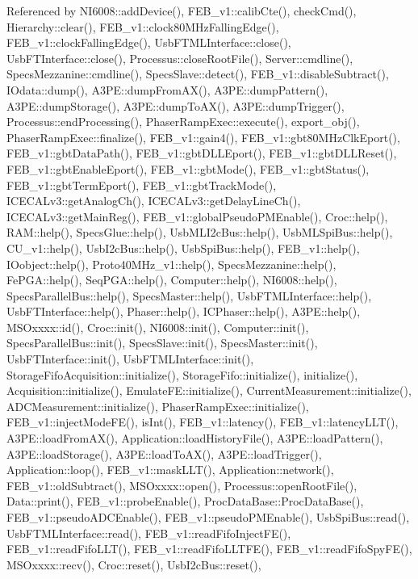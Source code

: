 Referenced by N\+I6008\+::add\+Device(), F\+E\+B\+\_\+v1\+::calib\+Cte(), check\+Cmd(), Hierarchy\+::clear(), F\+E\+B\+\_\+v1\+::clock80\+M\+Hz\+Falling\+Edge(), F\+E\+B\+\_\+v1\+::clock\+Falling\+Edge(), Usb\+F\+T\+M\+L\+Interface\+::close(), Usb\+F\+T\+Interface\+::close(), Processus\+::close\+Root\+File(), Server\+::cmdline(), Specs\+Mezzanine\+::cmdline(), Specs\+Slave\+::detect(), F\+E\+B\+\_\+v1\+::disable\+Subtract(), I\+Odata\+::dump(), A3\+P\+E\+::dump\+From\+A\+X(), A3\+P\+E\+::dump\+Pattern(), A3\+P\+E\+::dump\+Storage(), A3\+P\+E\+::dump\+To\+A\+X(), A3\+P\+E\+::dump\+Trigger(), Processus\+::end\+Processing(), Phaser\+Ramp\+Exec\+::execute(), export\+\_\+obj(), Phaser\+Ramp\+Exec\+::finalize(), F\+E\+B\+\_\+v1\+::gain4(), F\+E\+B\+\_\+v1\+::gbt80\+M\+Hz\+Clk\+Eport(), F\+E\+B\+\_\+v1\+::gbt\+Data\+Path(), F\+E\+B\+\_\+v1\+::gbt\+D\+L\+L\+Eport(), F\+E\+B\+\_\+v1\+::gbt\+D\+L\+L\+Reset(), F\+E\+B\+\_\+v1\+::gbt\+Enable\+Eport(), F\+E\+B\+\_\+v1\+::gbt\+Mode(), F\+E\+B\+\_\+v1\+::gbt\+Status(), F\+E\+B\+\_\+v1\+::gbt\+Term\+Eport(), F\+E\+B\+\_\+v1\+::gbt\+Track\+Mode(), I\+C\+E\+C\+A\+Lv3\+::get\+Analog\+Ch(), I\+C\+E\+C\+A\+Lv3\+::get\+Delay\+Line\+Ch(), I\+C\+E\+C\+A\+Lv3\+::get\+Main\+Reg(), F\+E\+B\+\_\+v1\+::global\+Pseudo\+P\+M\+Enable(), Croc\+::help(), R\+A\+M\+::help(), Specs\+Glue\+::help(), Usb\+M\+L\+I2c\+Bus\+::help(), Usb\+M\+L\+Spi\+Bus\+::help(), C\+U\+\_\+v1\+::help(), Usb\+I2c\+Bus\+::help(), Usb\+Spi\+Bus\+::help(), F\+E\+B\+\_\+v1\+::help(), I\+Oobject\+::help(), Proto40\+M\+Hz\+\_\+v1\+::help(), Specs\+Mezzanine\+::help(), Fe\+P\+G\+A\+::help(), Seq\+P\+G\+A\+::help(), Computer\+::help(), N\+I6008\+::help(), Specs\+Parallel\+Bus\+::help(), Specs\+Master\+::help(), Usb\+F\+T\+M\+L\+Interface\+::help(), Usb\+F\+T\+Interface\+::help(), Phaser\+::help(), I\+C\+Phaser\+::help(), A3\+P\+E\+::help(), M\+S\+Oxxxx\+::id(), Croc\+::init(), N\+I6008\+::init(), Computer\+::init(), Specs\+Parallel\+Bus\+::init(), Specs\+Slave\+::init(), Specs\+Master\+::init(), Usb\+F\+T\+Interface\+::init(), Usb\+F\+T\+M\+L\+Interface\+::init(), Storage\+Fifo\+Acquisition\+::initialize(), Storage\+Fifo\+::initialize(), initialize(), Acquisition\+::initialize(), Emulate\+F\+E\+::initialize(), Current\+Measurement\+::initialize(), A\+D\+C\+Measurement\+::initialize(), Phaser\+Ramp\+Exec\+::initialize(), F\+E\+B\+\_\+v1\+::inject\+Mode\+F\+E(), is\+Int(), F\+E\+B\+\_\+v1\+::latency(), F\+E\+B\+\_\+v1\+::latency\+L\+L\+T(), A3\+P\+E\+::load\+From\+A\+X(), Application\+::load\+History\+File(), A3\+P\+E\+::load\+Pattern(), A3\+P\+E\+::load\+Storage(), A3\+P\+E\+::load\+To\+A\+X(), A3\+P\+E\+::load\+Trigger(), Application\+::loop(), F\+E\+B\+\_\+v1\+::mask\+L\+L\+T(), Application\+::network(), F\+E\+B\+\_\+v1\+::old\+Subtract(), M\+S\+Oxxxx\+::open(), Processus\+::open\+Root\+File(), Data\+::print(), F\+E\+B\+\_\+v1\+::probe\+Enable(), Proc\+Data\+Base\+::\+Proc\+Data\+Base(), F\+E\+B\+\_\+v1\+::pseudo\+A\+D\+C\+Enable(), F\+E\+B\+\_\+v1\+::pseudo\+P\+M\+Enable(), Usb\+Spi\+Bus\+::read(), Usb\+F\+T\+M\+L\+Interface\+::read(), F\+E\+B\+\_\+v1\+::read\+Fifo\+Inject\+F\+E(), F\+E\+B\+\_\+v1\+::read\+Fifo\+L\+L\+T(), F\+E\+B\+\_\+v1\+::read\+Fifo\+L\+L\+T\+F\+E(), F\+E\+B\+\_\+v1\+::read\+Fifo\+Spy\+F\+E(), M\+S\+Oxxxx\+::recv(), Croc\+::reset(), Usb\+I2c\+Bus\+::reset(), 